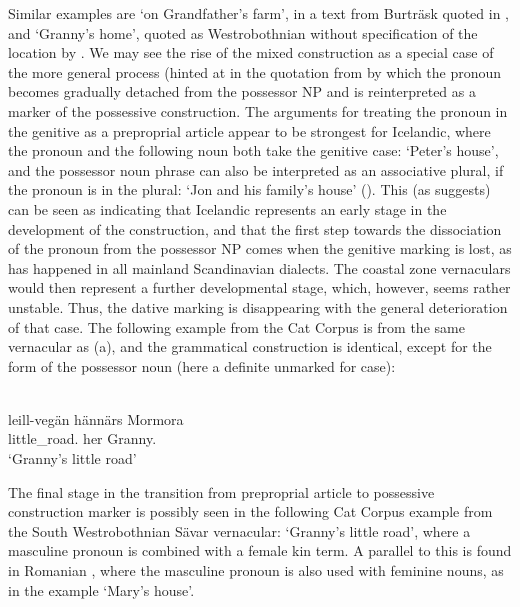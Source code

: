 Similar examples are  ‘on Grandfather’s farm’, in a text from Burträsk quoted in \citet[104]{Wessén1966}, and  ‘Granny’s home’, quoted as Westrobothnian without specification of the location by \citet[131]{Larsson1929}. We may see the rise of the mixed construction as a special case of the more general process (hinted at in the quotation from \citet{KoptjevskajaTamm2003} by which the pronoun becomes gradually detached from the possessor NP and is reinterpreted as a marker of the possessive construction. The arguments for treating the pronoun in the genitive as a preproprial article appear to be strongest for Icelandic, where the pronoun and the following noun both take the genitive case: ‘Peter’s house’, and the possessor noun phrase can also be interpreted as an associative plural, if the pronoun is in the plural:  ‘Jon and his family’s house’ (\citealt[69]{Delsing2003b}). This (as \citealt[632]{KoptjevskajaTamm2003} suggests) can be seen as indicating that Icelandic represents an early stage in the development of the construction, and that the first step towards the dissociation of the pronoun from the possessor NP comes when the genitive marking is lost, as has happened in all mainland Scandinavian dialects. The coastal zone vernaculars would then represent a further developmental stage, which, however, seems rather unstable. Thus, the dative marking is disappearing with the general deterioration of that case. The following example from the Cat Corpus is from the same vernacular as (a), and the grammatical construction is identical, except for the form of the possessor noun (here a definite unmarked for case): 

\ea%
\\
\gll leill-vegän  hännärs  Mormora\\
little\_road.{}  her  Granny.{}\\
\glt ‘Granny’s little road’
\z

 The final stage in the transition from preproprial article to possessive construction marker is possibly seen in the following Cat Corpus example from the South Westrobothnian Sävar vernacular: ‘Granny’s little road’, where a masculine pronoun is combined with a female kin term. A parallel to this is found in Romanian \citep[632]{KoptjevskajaTamm2003}, where the masculine pronoun  is also used with feminine nouns, as in the example  ‘Mary’s house’.

